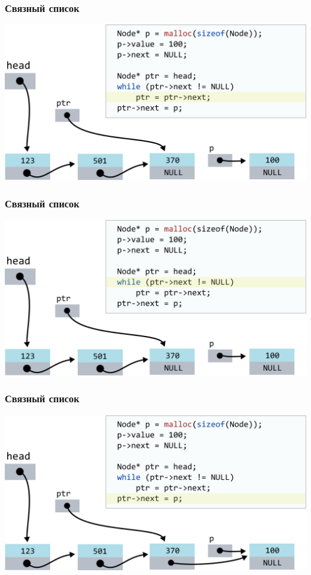 \documentclass[10pt,pdf,hyperref={unicode}]{beamer}
\begin{document}
\begin{frame}[fragile]
\frametitle{Связный список}
\begin{center}
\includegraphics[width=\imageSizeMult\linewidth]{../images/codelist/codelistf_insert9.png}
\end{center}
\end{frame}



\begin{frame}[fragile]
\frametitle{Связный список}
\begin{center}
\includegraphics[width=\imageSizeMult\linewidth]{../images/codelist/codelistf_insert10.png}
\end{center}
\end{frame}



\begin{frame}[fragile]
\frametitle{Связный список}
\begin{center}
\includegraphics[width=\imageSizeMult\linewidth]{../images/codelist/codelistf_insert11.png}
\end{center}
\end{frame}
\end{document}
